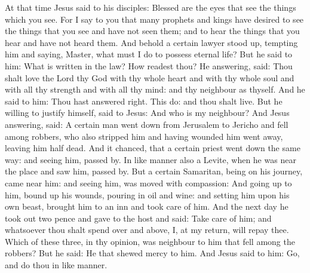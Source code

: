 \begin{multicols}{2}
At that time Jesus said to his disciples:
Blessed are the eyes that
see the things which you see.
For I say to you that many prophets and kings have desired to see
the things that you see and have not seen them; and to hear the things
that you hear and have not heard them.
And behold a certain lawyer stood up, tempting him and saying,
Master, what must I do to possess eternal life?
But he said to him: What is written in the law? How readest thou?
He answering, said: Thou shalt love the Lord thy God with thy
whole heart and with thy whole soul and with all thy strength and with
all thy mind: and thy neighbour as thyself.
And he said to him: Thou hast answered right. This do: and thou
shalt live.
But he willing to justify himself, said to Jesus: And who is my
neighbour?
And Jesus answering, said: A certain man went down from Jerusalem
to Jericho and fell among robbers, who also stripped him and having
wounded him went away, leaving him half dead.
And it chanced, that a certain priest went down the same way: and
seeing him, passed by.
In like manner also a Levite, when he was near the place and saw
him, passed by.
But a certain Samaritan, being on his journey, came near him: and
seeing him, was moved with compassion:
And going up to him, bound up his wounds, pouring in oil and
wine: and setting him upon his own beast, brought him to an inn and took
care of him.
And the next day he took out two pence and gave to the host and
said: Take care of him; and whatsoever thou shalt spend over and above,
I, at my return, will repay thee.
Which of these three, in thy opinion, was neighbour to him that
fell among the robbers?
But he said: He that shewed mercy to him. And Jesus said to him:
Go, and do thou in like manner.




\bigskip




\end{multicols}
